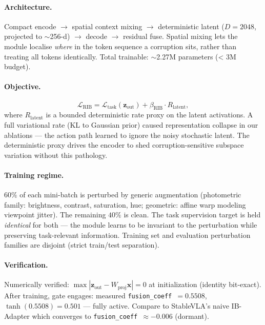 \documentclass[11pt,a4paper]{article}
\begin{document}
\paragraph{Architecture.}
Compact encode $\to$ spatial context mixing $\to$ deterministic latent ($D=2048$, projected
to $\sim$256-d) $\to$ decode $\to$ residual fuse. Spatial mixing lets the module localise
\emph{where} in the token sequence a corruption sits, rather than treating all tokens identically.
Total trainable: $\sim$2.27M parameters (< 3M budget).

\paragraph{Objective.}
\begin{equation}
  \mathcal{L}_{\text{RIB}} = \mathcal{L}_{\text{task}}(\mathbf{z}_{\text{out}}) + \beta_{\text{RIB}}\cdot R_{\text{latent}},
\end{equation}
where $R_{\text{latent}}$ is a bounded deterministic rate proxy on the latent activations.
A full variational rate (KL to Gaussian prior) caused representation collapse in our ablations
— the action path learned to ignore the noisy stochastic latent. The deterministic proxy drives
the encoder to shed corruption-sensitive subspace variation without this pathology.

\paragraph{Training regime.}
$60\%$ of each mini-batch is perturbed by generic augmentation (photometric family: brightness,
contrast, saturation, hue; geometric: affine warp modeling viewpoint jitter). The remaining
$40\%$ is clean. The task supervision target is held \emph{identical} for both — the module
learns to be invariant to the perturbation while preserving task-relevant information.
Training set and evaluation perturbation families are disjoint (strict train/test separation).

\paragraph{Verification.}
Numerically verified: $\max|\mathbf{z}_{\text{out}} - W_{\text{proj}}\mathbf{x}|=0$ at
initialization (identity bit-exact). After training, gate engages: measured
\texttt{fusion\_coeff}~$= 0.5508$, $\tanh(0.5508) = 0.501$ — fully active. Compare to
StableVLA's naive IB-Adapter which converges to \texttt{fusion\_coeff}~$\approx -0.006$
(dormant).
\end{document}
